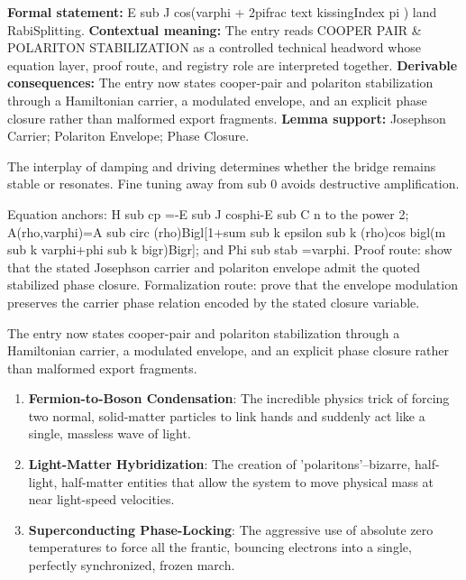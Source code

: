 \begingroup\footnotesize\setlength{\emergencystretch}{3em}\sloppy
\textbf{Formal statement:} E sub J cos(varphi + 2pifrac text kissingIndex pi ) land RabiSplitting. \textbf{Contextual meaning:} The entry reads COOPER PAIR \& POLARITON STABILIZATION as a controlled technical headword whose equation layer, proof route, and registry role are interpreted together. \textbf{Derivable consequences:} The entry now states cooper-pair and polariton stabilization through a Hamiltonian carrier, a modulated envelope, and an explicit phase closure rather than malformed export fragments. \textbf{Lemma support:} Josephson Carrier; Polariton Envelope; Phase Closure.\par
\endgroup

The interplay of damping and driving determines whether the bridge remains stable or resonates. Fine tuning away from sub 0 avoids destructive amplification.

Equation anchors: H sub cp =-E sub J cosphi-E sub C n to the power 2; A(rho,varphi)=A sub circ (rho)Bigl[1+sum sub k epsilon sub k (rho)cos bigl(m sub k varphi+phi sub k bigr)Bigr]; and Phi sub stab =varphi. Proof route: show that the stated Josephson carrier and polariton envelope admit the quoted stabilized phase closure. Formalization route: prove that the envelope modulation preserves the carrier phase relation encoded by the stated closure variable.

The entry now states cooper-pair and polariton stabilization through a Hamiltonian carrier, a modulated envelope, and an explicit phase closure rather than malformed export fragments.
\endgroup

\begin{enumerate}[leftmargin=1.6em,itemsep=6pt,topsep=4pt]
\item \textbf{Fermion-to-Boson Condensation}: The incredible physics trick of forcing two normal, solid-matter particles to link hands and suddenly act like a single, massless wave of light.
\item \textbf{Light-Matter Hybridization}: The creation of 'polaritons'--bizarre, half-light, half-matter entities that allow the system to move physical mass at near light-speed velocities.
\item \textbf{Superconducting Phase-Locking}: The aggressive use of absolute zero temperatures to force all the frantic, bouncing electrons into a single, perfectly synchronized, frozen march.
\end{enumerate}

